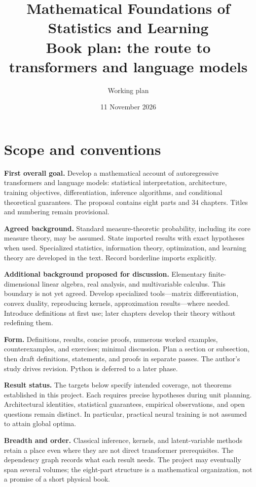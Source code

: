 \documentclass[11pt,oneside]{book}
\title{Mathematical Foundations of Statistics and Learning\\[6pt]\large Book plan: the route to transformers and language models}
\author{Working plan}
\date{11 November 2026}
\begin{document}
\hypersetup{pageanchor=false}
\maketitle
\clearpage
\hypersetup{pageanchor=true}
\frontmatter
\tableofcontents

\chapter*{Scope and conventions}

\textbf{First overall goal.} Develop a mathematical account of autoregressive
transformers and language models: statistical interpretation, architecture,
training objectives, differentiation, inference algorithms, and conditional
theoretical guarantees. The proposal contains eight parts and 34 chapters.
Titles and numbering remain provisional.

\textbf{Agreed background.} Standard measure-theoretic probability, including
its core measure theory, may be assumed. State imported results with exact
hypotheses when used. Specialized statistics, information theory, optimization,
and learning theory are developed in the text. Record borderline imports
explicitly.

\textbf{Additional background proposed for discussion.} Elementary
finite-dimensional linear algebra, real analysis, and multivariable calculus.
This boundary is not yet agreed. Develop specialized tools---matrix
differentiation, convex duality, reproducing kernels, approximation results---where
needed. Introduce definitions at first use; later chapters develop their theory
without redefining them.

\textbf{Form.} Definitions, results, concise proofs, numerous worked examples,
counterexamples, and exercises; minimal discussion. Plan a section or subsection,
then draft definitions, statements, and proofs in separate passes. The author's
study drives revision. Python is deferred to a later phase.

\textbf{Result status.} The targets below specify intended coverage, not
theorems established in this project. Each requires precise hypotheses during
unit planning. Architectural identities, statistical guarantees, empirical
observations, and open questions remain distinct. In particular, practical
neural training is not assumed to attain global optima.

\textbf{Breadth and order.} Classical inference, kernels, and latent-variable
methods retain a place even where they are not direct transformer prerequisites.
The dependency graph records what each result needs. The project may eventually
span several volumes; the eight-part structure is a mathematical organization,
not a promise of a short physical book.
\end{document}
